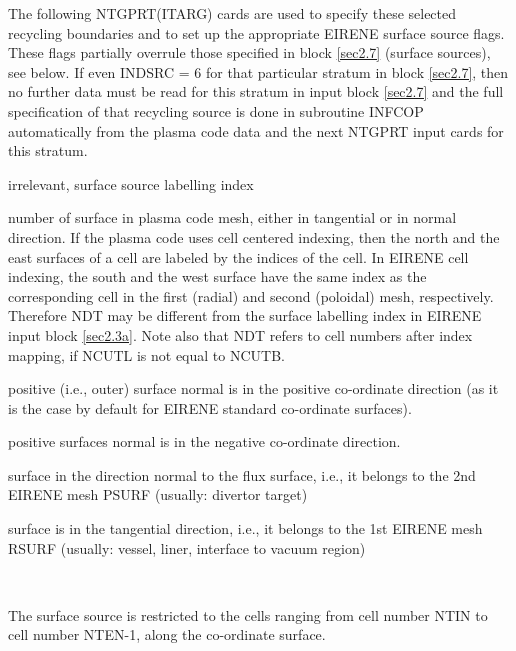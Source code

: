 The following NTGPRT(ITARG) cards are used to specify these selected
recycling
boundaries and to set up the appropriate EIRENE surface source flags.
These flags partially overrule those specified in
block \ref{sec2.7} (surface sources), see below. If even INDSRC = 6 for that
particular stratum in block \ref{sec2.7}, then no further data must be read for
this
stratum in input block \ref{sec2.7} and the full specification of that recycling
source is done in subroutine INFCOP automatically from the plasma code
data and the next NTGPRT input cards for this stratum.

\begin{list}{ }{}
\item[{\bf IT }]
irrelevant, surface source labelling index
\item[{\bf NDT }]
number of surface in plasma code mesh, either in tangential or in
normal direction. If the plasma code uses cell centered indexing, then
the north and the east surfaces of a cell are labeled by the indices of
the cell. In EIRENE cell indexing, the south and the west surface
have the same index as the corresponding cell in the first (radial)
and second (poloidal)
mesh, respectively.
Therefore NDT may be different from the surface labelling index in EIRENE input block \ref{sec2.3a}.
Note also that NDT refers to cell numbers after index mapping,
if NCUTL is not equal to NCUTB.
\item[{\bf NINCT }]
\begin{list}{ }{}
\item[{= 1 }]
positive (i.e., outer) surface normal is in the positive co-ordinate
direction (as it is the case by default for EIRENE standard co-ordinate
surfaces).
\item[{= -1 }]
positive surfaces normal is in the negative co-ordinate direction.
\end{list}
\item[{\bf NIXY }]
\begin{list}{ }{}
\item[{= 1 }]
surface in the direction normal to the flux surface, i.e., it belongs to
the
2nd EIRENE mesh PSURF (usually: divertor target)
\item[{= 2 }]
surface is in the tangential direction, i.e., it belongs to the 1st
EIRENE mesh RSURF (usually: vessel, liner, interface to vacuum
region)
\end{list}
\item[{\bf NTIN,NTEN }] ~

The surface source is restricted to the cells ranging from cell
number NTIN to cell number NTEN-1, along the co-ordinate surface.


\end{list}

